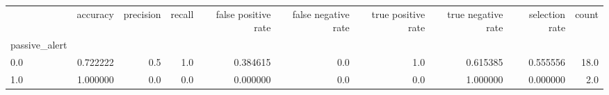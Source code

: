 \begin{tabular}{lrrrrrrrrr}
\toprule
{} &  accuracy &  precision &  recall &  false positive rate &  false negative rate &  true positive rate &  true negative rate &  selection rate &  count \\
passive\_alert &           &            &         &                      &                      &                     &                     &                 &        \\
\midrule
0.0           &  0.722222 &        0.5 &     1.0 &             0.384615 &                  0.0 &                 1.0 &            0.615385 &        0.555556 &   18.0 \\
1.0           &  1.000000 &        0.0 &     0.0 &             0.000000 &                  0.0 &                 0.0 &            1.000000 &        0.000000 &    2.0 \\
\bottomrule
\end{tabular}
